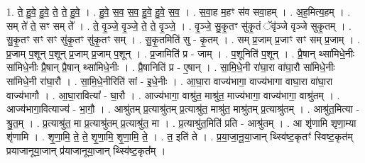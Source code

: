 \documentclass[17pt]{extarticle}
\begin{document}
1. ते॒ हु॒वे॒ हु॒वे॒ ते॒ ते॒ हु॒वे॒ । . हु॒वे॒ स॒व॒ स॒व॒ हु॒वे॒ हु॒वे॒ स॒व॒ । . स॒वा॒ह म॒हꣳ स॑व सवा॒हम् । . अ॒ह॒मित्य॒हम् । . सम् ते॑ ते॒ सꣳ सम् ते᳚ । . ते॒ वृ॒ञ्जे॒ वृ॒ञ्जे॒ ते॒ ते॒ वृ॒ञ्जे॒ । . वृ॒ञ्जे॒ सु॒कृ॒तꣳ सु॑कृ॒तं ॅवृ॑ञ्जे वृञ्जे सुकृ॒तम् । . सु॒कृ॒तꣳ सꣳ सꣳ सु॑कृ॒तꣳ सु॑कृ॒तꣳ सम् । . सु॒कृ॒तमिति॑ सु - कृ॒तम् । . सम् प्र॒जाम् प्र॒जाꣳ सꣳ सम् प्र॒जाम् । . प्र॒जाम् प॒शून् प॒शून् प्र॒जाम् प्र॒जाम् प॒शून् । . प्र॒जामिति॑ प्र - जाम् । . प॒शूनिति॑ प॒शून् । . प्रै॒षान् थ्सा॑मिधे॒नीः सा॑मिधे॒नीः प्रै॒षान् प्रै॒षान् थ्सा॑मिधे॒नीः । . प्रै॒षानिति॑ प्र - ए॒षान् । . सा॒मि॒धे॒नी रा॑घा॒रा वा॑घा॒रौ सा॑मिधे॒नीः सा॑मिधे॒नी रा॑घा॒रौ । . सा॒मि॒धे॒नीरिति॑ सां - इ॒धे॒नीः । . आ॒घा॒रा वाज्य॑भागा॒ वाज्य॑भागा वाघा॒रा वा॑घा॒रा वाज्य॑भागौ । . आ॒घा॒रावित्या᳚ - घा॒रौ । . आज्य॑भागा॒ वाश्रु॑त॒ माश्रु॑त॒ माज्य॑भागा॒ वाज्य॑भागा॒ वाश्रु॑तम् । . आज्य॑भागा॒वित्याज्य॑ - भा॒गौ॒ । . आश्रु॑तम् प्र॒त्याश्रु॑तम् प्र॒त्याश्रु॑त॒ माश्रु॑त॒ माश्रु॑तम् प्र॒त्याश्रु॑तम् । . आश्रु॑त॒मित्या - श्रु॒त॒म् । . प्र॒त्याश्रु॑त॒ मा प्र॒त्याश्रु॑तम् प्र॒त्याश्रु॑त॒ मा । . प्र॒त्याश्रु॑त॒मिति॑ प्रति - आश्रु॑तम् । . आ शृ॑णामि शृणा॒म्या शृ॑णामि । . शृ॒णा॒मि॒ ते॒ ते॒ शृ॒णा॒मि॒ शृ॒णा॒मि॒ ते॒ । . त॒ इति॑ ते । . प्र॒या॒जा॒नू॒या॒जान् थ्स्वि॑ष्ट॒कृतꣳ॑ स्विष्ट॒कृत॑म् प्रयाजानूया॒जान् प्र॑याजानूया॒जान् थ्स्वि॑ष्ट॒कृत᳚म् । \newline
\end{document}
